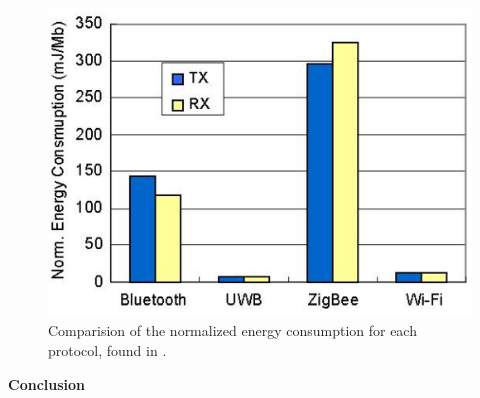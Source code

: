 \documentclass[10pt,a4paper]{article}
\begin{document}
\begin{figure}[H]
   \centering
   \includegraphics[width=1\textwidth]{images/protocolenergynormalized.png}
   \caption{Comparision of the normalized energy consumption for each protocol, found in \cite{comparitivestudywirelessprotocols}.}
   \label{fig:protocolenergynormalized}
\end{figure}


\textbf{Conclusion}\\
\end{document}
